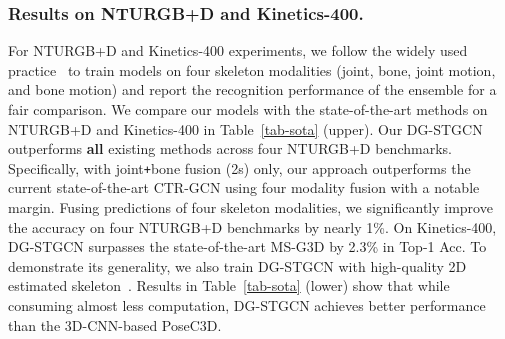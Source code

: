 \vspace{-3mm}
\subsubsection{Results on NTURGB+D and Kinetics-400. }

For NTURGB+D and Kinetics-400 experiments, we follow the widely used practice~\cite{chen2021channel,shi2020skeleton} to train models 
on four skeleton modalities (joint, bone, joint motion, and bone motion) and report the recognition performance of the ensemble for a fair comparison.
We compare our models with the state-of-the-art methods on NTURGB+D and Kinetics-400 in Table~\ref{tab-sota} (upper).
Our DG-STGCN outperforms \textbf{all} existing methods across four NTURGB+D benchmarks. 
Specifically, with joint\texttt{+}bone fusion (2s) only, 
our approach outperforms the current state-of-the-art CTR-GCN using four modality fusion with a notable margin. 
Fusing predictions of four skeleton modalities, we significantly improve the accuracy on four NTURGB+D benchmarks by nearly 1\%. 
On Kinetics-400, DG-STGCN surpasses the state-of-the-art MS-G3D by 2.3\% in Top-1 Acc. 
To demonstrate its generality, we also train DG-STGCN with high-quality 2D estimated skeleton~\cite{duan2021revisiting}. 
Results in Table~\ref{tab-sota} (lower) show that while consuming almost  less computation, DG-STGCN achieves better performance than the 3D-CNN-based PoseC3D. 



